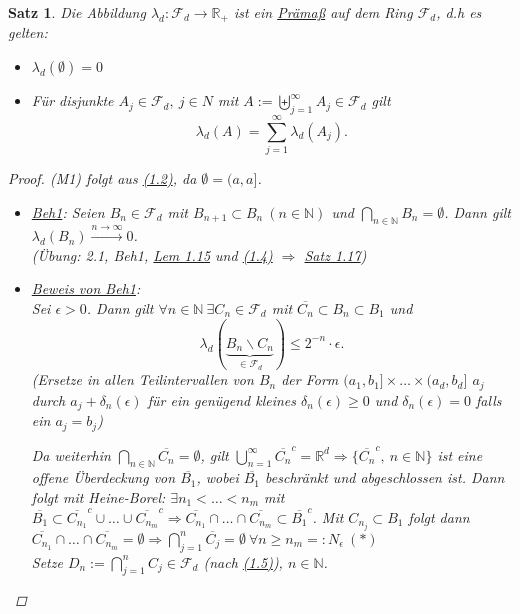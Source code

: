 \documentclass[a4paper]{report}
\newcommand{\R}{\mathbb{R}}
\newcommand{\N}{\mathbb{N}}
\newcommand{\Fd}{\mathcal{F}_d}
\newcommand{\bigdcup}{\biguplus}
\newcommand{\jlabel}[1]{\label{j_#1}}
\newcommand{\jhyperref}[2]{\hyperref[j_#1]{#2}}
\newcommand{\jlink}[1]{\jhyperref{#1}{#1}}
\theoremstyle{plain}
\newtheorem{satz}[thm]{Satz}
\theoremstyle{definition}
\begin{document}
{{{\begin{satz}
\jlabel{Satz 1.17}
    Die Abbildung $\lambda_d: \Fd \rightarrow \R_+$ ist ein \uline{Prämaß} auf dem Ring $\Fd$, d.h es gelten:
    \begin{itemize}
        \item[(M1)] $\lambda_d(\emptyset) = 0$
        \item[(M2*)] Für disjunkte $A_j\in\Fd, \ j \in N$ mit $A:=\bigdcup_{j=1}^\infty A_j \in \Fd$ gilt
            \begin{displaymath}
                \lambda_d(A) = \sum_{j=1}^\infty \lambda_d(A_j).
            \end{displaymath}
    \end{itemize}
    \begin{proof}
        (M1) folgt aus \jlink{(1.2)}, da $\emptyset = (a,a]$.
        \begin{itemize}
            \item[1)]
                \uline{Beh1}: Seien $B_n \in \Fd$ mit $B_{n+1} \subset B_n \ (n\in\N)$ und $\bigcap_{n \in\N} B_n = \emptyset$. Dann gilt $\lambda_d(B_n) \xrightarrow{n \rightarrow \infty} 0$.\\
                (Übung: 2.1, Beh1, \jlink{Lem 1.15} und \jlink{(1.4)} $\Rightarrow$ \jlink{Satz 1.17})
            \item[2)]
                \uline{Beweis von Beh1}:\\
                Sei $\epsilon > 0$. Dann gilt $\forall n \in \N \ \exists C_n \in\Fd$ mit $\overline{C_n} \subset B_n \subset B_1$ und
                \begin{displaymath}
                    \lambda_d(\underbrace{B_n \backslash C_n}_{\in \Fd}) \le 2^{-n}\cdot\epsilon.
                \end{displaymath}
                (Ersetze in allen Teilintervallen von $B_n$ der Form $(a_1,b_1]\times \dots \times (a_d, b_d]$ $a_j$ durch $a_j + \delta_n(\epsilon)$ für ein genügend kleines $\delta_n(\epsilon) \ge 0$ und $\delta_n(\epsilon) = 0$ falls ein $a_j=b_j$)
                
                Da weiterhin $\bigcap_{n\in\N} \overline{C_n} = \emptyset$, gilt $\bigcup_{n=1}^\infty \overline{C_n}^c =  \R^d \Rightarrow \{\overline{C_n}^c,\ n\in\N\}$ ist eine offene Überdeckung von $\overline{B_1}$, wobei $\overline{B_1}$ beschränkt und abgeschlossen ist. Dann folgt mit Heine-Borel: $\exists n_1 < \dots < n_m$ mit $\overline{B_1} \subset \overline{C_{n_1}}^c \cup \dots \cup \overline{C_{n_m}}^c \Rightarrow \overline{C_{n_1}} \cap \dots \cap \overline{C_{n_m}} \subset \overline{B_1}^c$. Mit $C_{n_j} \subset B_1$ folgt dann $\overline{C_{n_1}} \cap \dots \cap \overline{C_{n_m}} = \emptyset \Rightarrow \bigcap_{j=1}^n \overline{C_j} = \emptyset \ \forall n\ge n_m =: N_\epsilon \ (*)$\\
                Setze $D_n := \bigcap_{j=1}^n C_j \in \Fd$ (nach \jlink{(1.5)}), $n\in\N$.
                

\end{itemize}
\end{proof}
\end{satz}}}}
\end{document}
